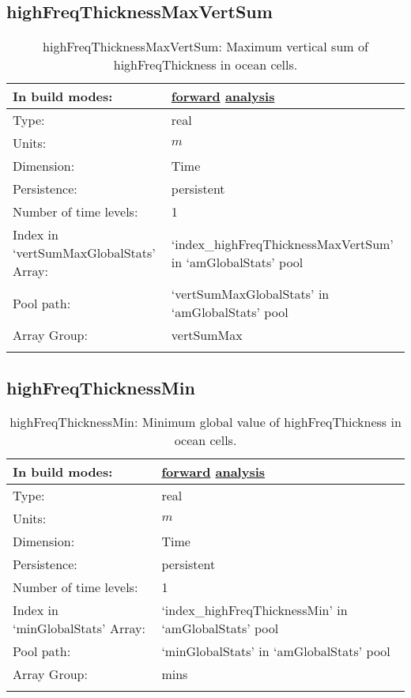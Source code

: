 \subsection[highFreqThicknessMaxVertSum]{highFreqThicknessMaxVertSum}
\label{subsec:var_sec_amGlobalStats_highFreqThicknessMaxVertSum}
\begin{center}
\begin{longtable}{| p{2.0in} | p{4.0in} |}
        \hline 
        In build modes: & \hyperref[subsec:forward_var_tab_amGlobalStats]{forward} \hyperref[subsec:analysis_var_tab_amGlobalStats]{analysis} \\
        \hline 
        Type: & real \\
        \hline 
        Units: & $m$ \\
        \hline 
        Dimension: & Time \\
        \hline 
        Persistence: & persistent \\
        \hline 
        Number of time levels: & 1 \\
        \hline 
		 Index in `vertSumMaxGlobalStats' Array: & `index\_highFreqThicknessMaxVertSum' in `amGlobalStats' pool \\
		 \hline 
            Pool path: & `vertSumMaxGlobalStats' in `amGlobalStats' pool \\
		 \hline 
		 Array Group: & vertSumMax \\
		 \hline 
    \caption{highFreqThicknessMaxVertSum: Maximum vertical sum of highFreqThickness in ocean cells.}
\end{longtable}
\end{center}
\subsection[highFreqThicknessMin]{highFreqThicknessMin}
\label{subsec:var_sec_amGlobalStats_highFreqThicknessMin}
\begin{center}
\begin{longtable}{| p{2.0in} | p{4.0in} |}
        \hline 
        In build modes: & \hyperref[subsec:forward_var_tab_amGlobalStats]{forward} \hyperref[subsec:analysis_var_tab_amGlobalStats]{analysis} \\
        \hline 
        Type: & real \\
        \hline 
        Units: & $m$ \\
        \hline 
        Dimension: & Time \\
        \hline 
        Persistence: & persistent \\
        \hline 
        Number of time levels: & 1 \\
        \hline 
		 Index in `minGlobalStats' Array: & `index\_highFreqThicknessMin' in `amGlobalStats' pool \\
		 \hline 
            Pool path: & `minGlobalStats' in `amGlobalStats' pool \\
		 \hline 
		 Array Group: & mins \\
		 \hline 
    \caption{highFreqThicknessMin: Minimum global value of highFreqThickness in ocean cells.}
\end{longtable}
\end{center}
